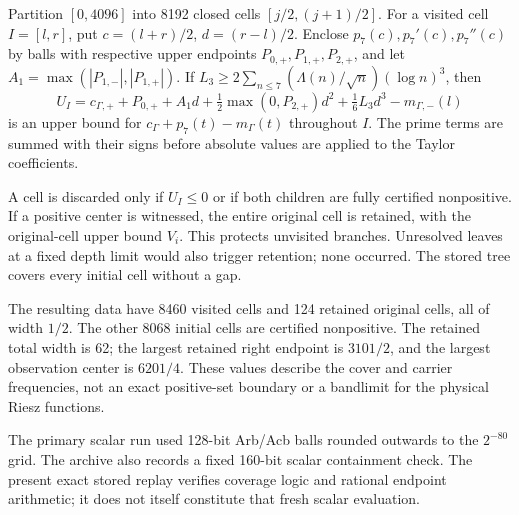 \documentclass[11pt,a4paper]{article}
\numberwithin{equation}{section}
\theoremstyle{definition}\newtheorem{definition}[theorem]{Definition}
\theoremstyle{remark}\newtheorem{remark}[theorem]{Remark}
\begin{document}
Partition $[0,4096]$ into 8192 closed cells $[j/2,(j+1)/2]$. For a visited cell $I=[l,r]$, put $c=(l+r)/2$, $d=(r-l)/2$. Enclose $p_7(c),p_7'(c),p_7''(c)$ by balls with respective upper endpoints $P_{0,+},P_{1,+},P_{2,+}$, and let
$A_1=\max(|P_{1,-}|,|P_{1,+}|)$.
If $L_3\ge2\sum_{n\le7}(\Lambda(n)/\sqrt n)(\log n)^3$, then
\begin{equation}\label{eq:cell}
 U_I=c_{\Gamma,+}+P_{0,+}+A_1d+\tfrac12\max(0,P_{2,+})d^2
 +\tfrac16L_3d^3-m_{\Gamma,-}(l)
\end{equation}
is an upper bound for $c_\Gamma+p_7(t)-m_\Gamma(t)$ throughout $I$. The prime terms are summed with their signs before absolute values are applied to the Taylor coefficients.

A cell is discarded only if $U_I\le0$ or if both children are fully certified nonpositive. If a positive center is witnessed, the entire original cell is retained, with the original-cell upper bound $V_i$. This protects unvisited branches. Unresolved leaves at a fixed depth limit would also trigger retention; none occurred. The stored tree covers every initial cell without a gap.

The resulting data have 8460 visited cells and 124 retained original cells, all of width $1/2$. The other 8068 initial cells are certified nonpositive. The retained total width is 62; the largest retained right endpoint is $3101/2$, and the largest observation center is $6201/4$. These values describe the cover and carrier frequencies, not an exact positive-set boundary or a bandlimit for the physical Riesz functions.

The primary scalar run used 128-bit Arb/Acb balls rounded outwards to the $2^{-80}$ grid. The archive also records a fixed 160-bit scalar containment check. The present exact stored replay verifies coverage logic and rational endpoint arithmetic; it does not itself constitute that fresh scalar evaluation.
\end{document}
